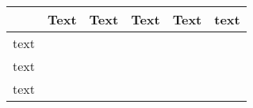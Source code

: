 \documentclass{article}
\begin{document}
 \begin{table}[H]
 \centering
 \begin{tabular}{l|r|r|r|r|c|}
 \hline
 & \multicolumn{1}{c|}{Text} & \multicolumn{1}{c|}{Text} & \multicolumn{1}{c|}{Text} & \multicolumn{1}{c|}{Text} & \multicolumn{1}{c|}{text}\\
 \hline
  text &&&&& \parbox[t]{2mm}{}\\
  text &&&&& \\
  text &&&&& \\
 \hline
 \end{tabular}
 \end{table}
 
\end{document}
